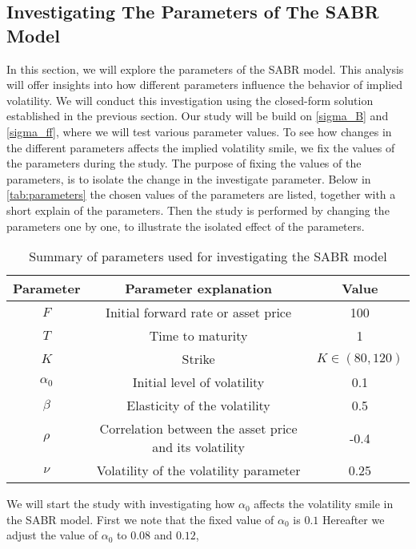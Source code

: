 \subsection{Investigating The Parameters of The SABR Model} \label{invest_sabr}
In this section, we will explore the parameters of the SABR model. This analysis will offer insights into 
how different parameters influence the behavior of implied volatility. We will conduct this investigation using 
the closed-form solution established in the previous section. Our study will be build on  \autoref{sigma_B} and 
\autoref{sigma_ff}, where we will test various parameter values. To see how changes in the different parameters
affects the implied volatility smile, we fix the values of the parameters during the study. 
The purpose of fixing the values of the parameters, is to isolate the change in the investigate parameter. 
Below in \autoref{tab:parameters} the chosen values of the parameters are listed, together with a short
explain of the parameters. Then the study is performed by changing the parameters one by one, to illustrate the 
isolated effect of the parameters. 
\\
\begin{table}[H]
    \centering
    \begin{tabular}{ccc}
      \toprule
      \textbf{Parameter} & \textbf{Parameter explanation} & \textbf{Value} \\
      \midrule
      \rowcolor{lightgray!40} $F$ & Initial forward rate or asset price & 100 \\
      $T$ & Time to maturity & 1 \\
      \rowcolor{lightgray!40} $K$ & Strike & $K \in (80,120)$ \\
      $\alpha_0$ & Initial level of volatility & 0.1 \\
      \rowcolor{lightgray!40} $\beta$ & Elasticity of the volatility & 0.5 \\
      $\rho$ & Correlation between the asset price and its volatility & -0.4 \\
      \rowcolor{lightgray!40} $\nu$ & Volatility of the volatility parameter & 0.25 \\
      \bottomrule
    \end{tabular}
    \caption{Summary of parameters used for investigating the SABR model}
    \label{tab:parameters}
\end{table}
\noindent
We will start the study with investigating how $\alpha_0$ affects the volatility smile in the SABR model. 
First we note that the fixed value of $\alpha_0$ is $0.1$ Hereafter we adjust the value of $\alpha_0$ to $0.08$ and $0.12$,
